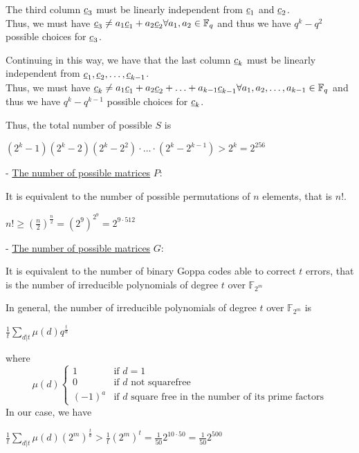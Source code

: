 \noindent
The third column $\underline{c}_3$ must be linearly independent from $\underline{c}_1$ and $\underline{c}_2$.\\
Thus, we must have $\underline{c}_3 \neq a_1\underline{c}_1 + a_2\underline{c}_2 \forall a_1, a_2 \in \mathbb{F}_q$ and thus we have $q^k - q^2$ possible choices for $\underline{c}_3$.
\medskip

\noindent
Continuing in this way, we have that the last column $\underline{c}_k$ must be linearly independent from $\underline{c}_1, \underline{c}_2, \ldots, \underline{c}_{k-1}$.\\
Thus, we must have $\underline{c}_k \neq a_1\underline{c}_1 + a_2\underline{c}_2 + \ldots + a_{k-1}\underline{c}_{k-1} \forall a_1, a_2, \ldots, a_{k-1} \in \mathbb{F}_q$ and thus we have $q^k - q^{k-1}$ possible choices for $\underline{c}_k$.
\bigskip

\noindent
Thus, the total number of possible $S$ is
\begin{center}
    $(2^k - 1)(2^k - 2)(2^k - 2^2) \cdot \ldots \cdot (2^k - 2^{k-1}) > 2^k = 2^{256}$
\end{center}
\vspace{1 cm}

\noindent
- \underline{The number of possible matrices} $P$:
\medskip

\noindent
It is equivalent to the number of possible permutations of $n$ elements, that is $n!$.
\begin{center}
    $n! \geq (\frac{n}{2})^{\frac{n}{2}} = (2^9)^{2^9} = 2^{9 \cdot 512} $
\end{center}
\vspace{1 cm}

\noindent
- \underline{The number of possible matrices} $G$:
\medskip

\noindent
It is equivalent to the number of binary Goppa codes able to correct $t$ errors, that is the number of irreducible polynomials of degree $t$ over $\mathbb{F}_{2^m}$
\medskip

\noindent
In general, the number of irreducible polynomials of degree $t$ over $\mathbb{F}_{2^m}$ is
\begin{center}
    $\frac{1}{t} \sum_{d | t} \mu(d) q^{\frac{t}{d}}$
\end{center}
\noindent
where \[\mu(d)\begin{cases}
    1 & \text{if } d=1 \\
    0 & \text{if } d \text{ not squarefree}\\
    (-1)^a & \text{if } d \text{ square free in the number of its prime factors}
\end{cases}\]
\noindent
In our case, we have
\begin{center}
    $\frac{1}{t} \sum_{d | t} \mu(d) (2^m)^{\frac{t}{d}} > \frac{1}{t} (2^m)^t = \frac{1}{50} 2^{10 \cdot 50} = \frac{1}{50} 2^{500}$
\end{center}

